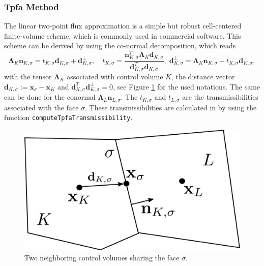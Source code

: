 \subsubsection{Tpfa Method}\label{cc_tpfa}
The linear two-point flux approximation is a simple but robust cell-centered finite-volume scheme, which is commonly used in commercial software.
This scheme can be derived by using the co-normal decomposition, which reads
\begin{equation}
\mathbf{\Lambda}_K \mathbf{n}_{K, \sigma} = t_{K,\sigma} \mathbf{d}_{K,\sigma} + \mathbf{d}^{\bot}_{K,\sigma}, \quad  t_{K,\sigma} = \frac{\mathbf{n}_{K, \sigma}^T \mathbf{\Lambda}_K \mathbf{d}_{K,\sigma} }{\mathbf{d}_{K,\sigma}^T \mathbf{d}_{K,\sigma}}, \; \mathbf{d}^{\bot}_{K,\sigma} = \mathbf{\Lambda}_K \mathbf{n}_{K, \sigma} - t_{K,\sigma} \mathbf{d}_{K,\sigma},
\label{eq:conormalDecTpfa}
\end{equation}
with the tensor $\mathbf{\Lambda}_K$ associated with control volume $K$, the distance vector $\mathbf{d}_{K,\sigma} := \mathbf{x}_\sigma - \mathbf{x}_K$ and $\mathbf{d}_{K,\sigma}^T \mathbf{d}^{\bot}_{K,\sigma} = 0$, see Figure \ref{pc:cctpfa} for the used notations. The same can be done for the conormal $\mathbf{\Lambda}_L \mathbf{n}_{L, \sigma}$. The $t_{K,\sigma}$ and $t_{L,\sigma}$ are the transmissibilities associated with the face $\sigma$. These transmissibilities are calculated in \Dumux by using the function \texttt{computeTpfaTransmissibility}.

\begin{figure} [ht]
\centering
\includegraphics[width=0.4\linewidth,keepaspectratio]{png/cctpfa.png}
\caption{Two neighboring control volumes sharing the face $\sigma$.}
\label{pc:cctpfa}
\end{figure}



